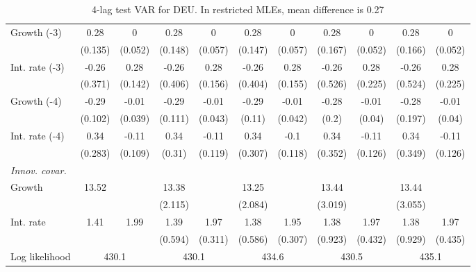 \begin{table}[htbp]
\begin{tabular}{@{\extracolsep{4pt}}lcccccccccc@{}}
\quad Growth (-3) 	 &0.28 	 & 0 	 & 0.28 	 & 0 	 & 0.28 	 & 0 	 & 0.28 	 & 0 	 & 0.28 	 & 0	 \\ 
 		 & (0.135) 	 & (0.052) 	 & (0.148) 	 & (0.057) 	 & (0.147) 	 & (0.057) 	 & (0.167) 	 & (0.052) 	 & (0.166) 	 & (0.052) 	 \\ 
\quad Int. rate (-3) 	 &-0.26 	 & 0.28 	 & -0.26 	 & 0.28 	 & -0.26 	 & 0.28 	 & -0.26 	 & 0.28 	 & -0.26 	 & 0.28	 \\ 
 		 & (0.371) 	 & (0.142) 	 & (0.406) 	 & (0.156) 	 & (0.404) 	 & (0.155) 	 & (0.526) 	 & (0.225) 	 & (0.524) 	 & (0.225) 	 \\ 
\quad Growth (-4) 	 &-0.29 	 & -0.01 	 & -0.29 	 & -0.01 	 & -0.29 	 & -0.01 	 & -0.28 	 & -0.01 	 & -0.28 	 & -0.01	 \\ 
 		 & (0.102) 	 & (0.039) 	 & (0.111) 	 & (0.043) 	 & (0.11) 	 & (0.042) 	 & (0.2) 	 & (0.04) 	 & (0.197) 	 & (0.04) 	 \\ 
\quad Int. rate (-4) 	 &0.34 	 & -0.11 	 & 0.34 	 & -0.11 	 & 0.34 	 & -0.1 	 & 0.34 	 & -0.11 	 & 0.34 	 & -0.11	 \\ 
 		 & (0.283) 	 & (0.109) 	 & (0.31) 	 & (0.119) 	 & (0.307) 	 & (0.118) 	 & (0.352) 	 & (0.126) 	 & (0.349) 	 & (0.126) 	 \\ 
\rule{0pt}{4ex} \emph{Innov. covar.}  	 & 	 & 	 & 	 & 	 & 	 & 	 & 	 & 	 & 	 &\\ 
\quad Growth 	 &13.52 	 &  	 & 13.38 	 &  	 & 13.25 	 &  	 & 13.44 	 &  	 & 13.44 	 & 	 \\ 
 		 &  	 &  	 & (2.115) 	 &  	 & (2.084) 	 &  	 & (3.019) 	 &  	 & (3.055) 	 &  	 \\ 
\quad Int. rate 	 &1.41 	 & 1.99 	 & 1.39 	 & 1.97 	 & 1.38 	 & 1.95 	 & 1.38 	 & 1.97 	 & 1.38 	 & 1.97	 \\ 
 		 &  	 &  	 & (0.594) 	 & (0.311) 	 & (0.586) 	 & (0.307) 	 & (0.923) 	 & (0.432) 	 & (0.929) 	 & (0.435) 	 \\ 
 \hline \rule{0pt}{4ex} 
  Log likelihood 	 &\multicolumn{2}{c}{430.1} 	 & \multicolumn{2}{c}{430.1} 	 & \multicolumn{2}{c}{434.6} 	 & \multicolumn{2}{c}{430.5} 	 & \multicolumn{2}{c}{435.1}\\ 

 \hline 	\end{tabular}		\caption{4-lag test VAR for DEU. In restricted MLEs, mean difference is 0.27}
		\label{tab:DEU4lag}

\end{table}